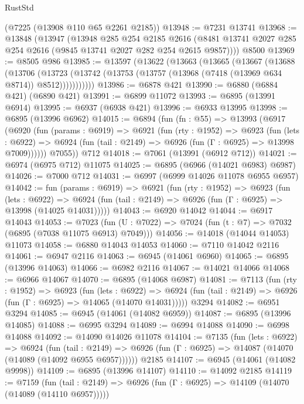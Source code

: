 \begin{lexlean}{RustStd}
\begin{coremodule}
    (@7225 (@13908 @110 @65 @2261 @2185))
@13948 := @7231 @13741
@13968 := @13848
    (@13947
      (@13948
        @285
        @254
        @2185
        @2616
        (@8481 @13741 @2027 @285 @254 @2616 (@9845 @13741 @2027 @282 @254 @2615 @9857))))
    @8500
@13969 := @8505 @986
@13985 := @13597
    (@13622
      (@13663
        (@13665
          (@13667
            (@13688
              (@13706
                (@13723 (@13742 (@13753 (@13757 (@13968 (@7418 (@13969 @634 @8714)) @8512)))))))))))
@13986 := @6878 @421
@13990 := @6880 (@6884 @421) (@6890 @421)
@13991 := @6899 @11072
@13993 := @6895 (@13991 @6914)
@13995 := @6937 (@6938 @421)
@13996 := @6933 @13995
@13998 := @6895 (@13996 @6962)
@14015 := @6894
    (fun (fn : @55) =>
    @13993
      (@6917
        (@6920
          (fun (params : @6919) =>
          @6921
            (fun (rty : @1952) =>
            @6923
              (fun (lets : @6922) =>
              @6924 (fun (tail : @2149) => @6926 (fun (Γ : @6925) => @13998 @7009))))))
        @7055))
    @712
@14018 := @7061 (@13991 (@6912 @712))
@14021 := @6974 (@6975 @712) @11075
@14025 := @6895 (@6966 (@14021 @6983) @6987)
@14026 := @7000 @712
@14031 := @6997 (@6999 @14026 @11078 @6955 @6957)
@14042 := fun (params : @6919) =>
  @6921
    (fun (rty : @1952) =>
    @6923
      (fun (lets : @6922) =>
      @6924 (fun (tail : @2149) => @6926 (fun (Γ : @6925) => @13998 (@14025 @14031)))))
@14043 := @6920 @14042
@14044 := @6917 @14043
@14053 := @7023
    (fun (U : @7022) => @7024 (fun (t : @7) => @7032 (@6895 (@7038 @11075 @6913) @7049)))
@14056 := @14018 (@14044 @14053) @11073
@14058 := @6880 @14043 @14053
@14060 := @7110 @14042 @2116
@14061 := @6947 @2116
@14063 := @6945 (@14061 @6960)
@14065 := @6895 (@13996 @14063)
@14066 := @6982 @2116
@14067 := @14021 @14066
@14068 := @6966 @14067
@14070 := @6895 (@14068 @6987)
@14081 := @7113
    (fun (rty : @1952) =>
    @6923
      (fun (lets : @6922) =>
      @6924 (fun (tail : @2149) => @6926 (fun (Γ : @6925) => @14065 (@14070 @14031)))))
    @3294
@14082 := @6951 @3294
@14085 := @6945 (@14061 (@14082 @6959))
@14087 := @6895 (@13996 @14085)
@14088 := @6995 @3294
@14089 := @6994 @14088
@14090 := @6998 @14088
@14092 := @14090 @14026 @11078
@14104 := @7135
    (fun (lets : @6922) =>
    @6924
      (fun (tail : @2149) =>
      @6926 (fun (Γ : @6925) => @14087 (@14070 (@14089 (@14092 @6955 @6957))))))
    @2185
@14107 := @6945 (@14061 (@14082 @9998))
@14109 := @6895 (@13996 @14107)
@14110 := @14092 @2185
@14119 := @7159
    (fun (tail : @2149) => @6926 (fun (Γ : @6925) => @14109 (@14070 (@14089 (@14110 @6957)))))

\end{coremodule}
\end{lexlean}

